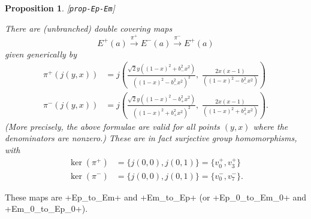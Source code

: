 \documentclass[reqno]{amsart}
\newcommand{\lbl}[1]{\label{#1}\textup{[\texttt{#1}]}\par}
\newcommand{\lbl}{\label}
\newcommand{\xra}       {\xrightarrow}
\newcommand{\rt}        {\sqrt{2}}
\renewcommand{\:}{\colon}
\newtheorem{proposition}[theorem]{Proposition}
\theoremstyle{definition}
\begin{document}
\begin{proposition}\lbl{prop-Ep-Em}
 There are (unbranched) double covering maps
 \[ E^+(a)\xra{\pi^+} E^-(a) \xra{\pi^-} E^+(a) \]
 given generically by
 \begin{align*}
  \pi^+(j(y,x)) &=
    j\left(
      \frac{\rt y((1-x)^2+b_-^2x^2)}{((1-x)^2-b_-^2x^2)^2},\;
      \frac{2x(x-1)}{((1-x)^2-b_-^2x^2)}
     \right) \\
  \pi^-(j(y,x)) &=
    j\left(
      \frac{\rt y((1-x)^2-b_+^2x^2)}{((1-x)^2+b_+^2x^2)^2},\;
      \frac{2x(x-1)}{((1-x)^2+b_+^2x^2)}
     \right).
 \end{align*}
 (More precisely, the above formulae are valid for all points $(y,x)$
 where the denominators are nonzero.)  These are in fact surjective
 group homomorphisms, with
 \begin{align*}
  \ker(\pi^+) &= \{j(0,0),j(0,1)\} = \{v_0^+,v_3^+\} \\
  \ker(\pi^-) &= \{j(0,0),j(0,1)\} = \{v_0^-,v_7^-\}.
 \end{align*}
\end{proposition}
These maps are \mcode+Ep_to_Em+ and \mcode+Em_to_Ep+ (or
\mcode+Ep_0_to_Em_0+ and \mcode+Em_0_to_Ep_0+).
\end{document}
